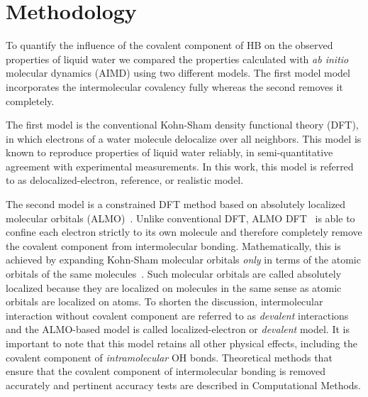\documentclass[aps,prl,reprint,amsmath,amssymb]{revtex4-1}
\begin{document}


\section{Methodology}

To quantify the influence of the covalent component of HB on the observed properties of liquid water we compared the properties calculated with \emph{ab initio} molecular dynamics (AIMD) using two different models. 
The first model model incorporates the intermolecular covalency fully whereas the second removes it completely.

The first model is the conventional Kohn-Sham density functional theory (DFT), in which electrons of a water molecule delocalize over all neighbors. 
This model is known to reproduce properties of liquid water reliably, in semi-quantitative agreement with experimental measurements. 
In this work, this model is referred to as delocalized-electron, reference, or realistic model. 

The second model is a constrained DFT method based on absolutely localized molecular orbitals (ALMO)~\cite{khaliullin2006efficient}. 
Unlike conventional DFT, ALMO DFT~\cite{Khaliullin2013JCTC} is able to confine each electron strictly to its own molecule and therefore completely remove the covalent component from intermolecular bonding. 
Mathematically, this is achieved by expanding Kohn-Sham molecular orbitals \emph{only} in terms of the atomic orbitals of the same molecules~\cite{gian,khaliullin2006efficient, blw}. 
Such molecular orbitals are called absolutely localized because they are localized on molecules in the same sense as atomic orbitals are localized on atoms. 
To shorten the discussion, intermolecular interaction without covalent component are referred to as \emph{devalent} interactions and the ALMO-based model is called localized-electron or \emph{devalent} model. 
It is important to note that this model retains all other physical effects, including the covalent component of \emph{intramolecular} OH bonds. %
Theoretical methods that ensure that the covalent component of intermolecular bonding is removed accurately and pertinent accuracy tests are described in Computational Methods.
\end{document}
